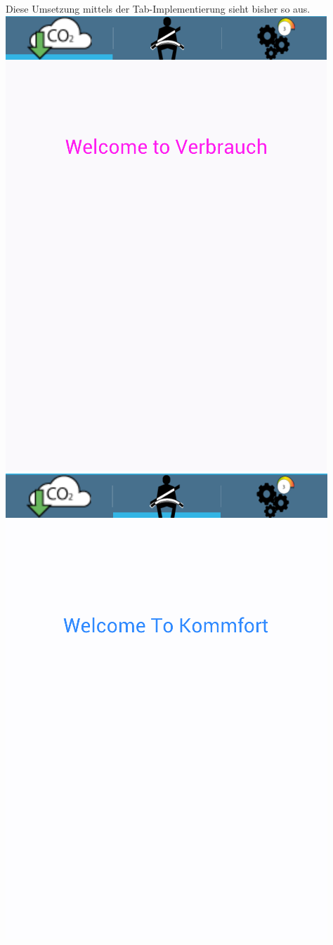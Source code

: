 Diese Umsetzung mittels der Tab-Implementierung sieht bisher so aus.
\newpage
\includegraphics[scale=0.4]{images/Verbrauch.png}
\includegraphics[scale=0.4]{images/Komfort.png}
